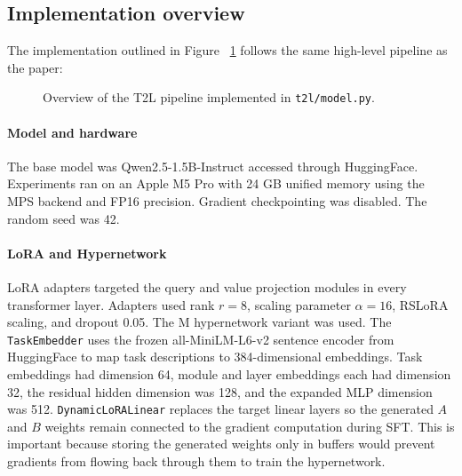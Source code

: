\documentclass{article}
\begin{document}
\subsection{Implementation overview}

The implementation outlined in Figure ~\ref{fig:sketch} follows the same high-level pipeline as the paper:

\begin{figure}[!htbp]
\centering
{}
\caption{Overview of the T2L pipeline implemented in \texttt{t2l/model.py}.}
\label{fig:sketch}
\end{figure}

\paragraph{Model and hardware}
The base model was Qwen2.5-1.5B-Instruct accessed through HuggingFace. Experiments ran on an Apple M5 Pro with 24 GB unified memory using the MPS backend and FP16 precision. Gradient checkpointing was disabled. The random seed was 42.

\paragraph{LoRA and Hypernetwork}
LoRA adapters targeted the query and value projection modules in every transformer layer. Adapters used rank $r=8$, scaling parameter $\alpha=16$, RSLoRA scaling, and dropout 0.05. The M hypernetwork
variant was used. The \texttt{TaskEmbedder} uses the frozen all-MiniLM-L6-v2 sentence encoder from HuggingFace to map task descriptions to 384-dimensional embeddings. Task embeddings had dimension 64, module and layer embeddings each had dimension 32, the residual hidden dimension was 128, and the expanded MLP dimension was 512. \texttt{DynamicLoRALinear} replaces the target linear layers so the generated $A$ and $B$ weights remain connected to the gradient computation during SFT. This is important because storing the generated weights only in buffers would prevent gradients from flowing back through them to train the hypernetwork.
\end{document}
